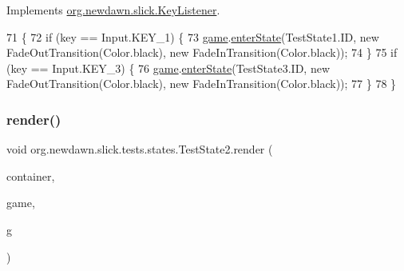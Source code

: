 Implements \mbox{\hyperlink{interfaceorg_1_1newdawn_1_1slick_1_1_key_listener_a474673b59bc77266bcef3c261c26ee2b}{org.\+newdawn.\+slick.\+Key\+Listener}}.


\begin{DoxyCode}
71                                              \{
72         \textcolor{keywordflow}{if} (key == Input.KEY\_1) \{
73             \mbox{\hyperlink{classorg_1_1newdawn_1_1slick_1_1tests_1_1states_1_1_test_state2_a76ea26ba609bd0c48b8690f2e797763a}{game}}.\mbox{\hyperlink{classorg_1_1newdawn_1_1slick_1_1state_1_1_state_based_game_a30b279d5177837e9d4eee745c79cc069}{enterState}}(TestState1.ID, \textcolor{keyword}{new} FadeOutTransition(Color.black), \textcolor{keyword}{new} 
      FadeInTransition(Color.black));
74         \}
75         \textcolor{keywordflow}{if} (key == Input.KEY\_3) \{
76             \mbox{\hyperlink{classorg_1_1newdawn_1_1slick_1_1tests_1_1states_1_1_test_state2_a76ea26ba609bd0c48b8690f2e797763a}{game}}.\mbox{\hyperlink{classorg_1_1newdawn_1_1slick_1_1state_1_1_state_based_game_a30b279d5177837e9d4eee745c79cc069}{enterState}}(TestState3.ID, \textcolor{keyword}{new} FadeOutTransition(Color.black), \textcolor{keyword}{new} 
      FadeInTransition(Color.black));
77         \}
78     \}
\end{DoxyCode}
\mbox{\label{classorg_1_1newdawn_1_1slick_1_1tests_1_1states_1_1_test_state2_a28f05d3267f4376851287e4696808182}} 
\subsubsection{\texorpdfstring{render()}{render()}}
{\footnotesize\ttfamily void org.\+newdawn.\+slick.\+tests.\+states.\+Test\+State2.\+render (\begin{DoxyParamCaption}\item[{\mbox{\hyperlink{classorg_1_1newdawn_1_1slick_1_1_game_container}{Game\+Container}}}]{container,  }\item[{\mbox{\hyperlink{classorg_1_1newdawn_1_1slick_1_1state_1_1_state_based_game}{State\+Based\+Game}}}]{game,  }\item[{\mbox{\hyperlink{classorg_1_1newdawn_1_1slick_1_1_graphics}{Graphics}}}]{g }\end{DoxyParamCaption})\hspace{0.3cm}{\ttfamily [inline]}}

